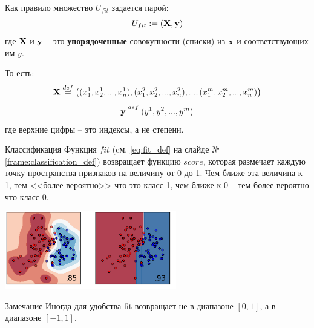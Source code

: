 	\begin{frame}
	Как правило множество $U_{fit}$ задается парой:
	\begin{equation}
		U_{fit} := (\bold X, \bold y) 
	\end{equation}
	где $\bold X$ и $\bold y$ -- это \textbf{упорядоченные} совокупности (списки)
	из  $\bold  x$ и соответствующих им  $y$. 
	
	
	То есть:
	\begin{equation}
	\bold X \stackrel{def}{=} \left( 
	(x_1^1, x_2^1, ..., x_n^1),
	(x_1^2, x_2^2, ..., x_n^2),
	... ,
	(x_1^m, x_2^m, ..., x_n^m)
	\right)
	\end{equation}
	\begin{equation}
	\bold y \stackrel{def}{=} (y^1, y^2, ..., y^m) 
	\end{equation}
	где верхние цифры -- это индексы, а не степени.
	\end{frame}


	  
	\begin{frame}{Классификация}
	\small
	Функция $fit$ (cм. \eqref{eq:fit_def} на слайде №\ref{frame:classification_def}) возвращает функцию $score$, которая размечает каждую точку пространства признаков на величину от 0 до 1. Чем ближе эта величина к 1, тем <<более вероятно>> что это класс 1, чем ближе к 0 -- тем более вероятно что класс 0.
	\begin{center}
		\includegraphics[width=7.5cm]{../pic/classification_example.png}\centering
	\end{center}
    \begin{block}{Замечание}
    Иногда для удобства fit возвращает не в диапазоне $[0, 1]$,
    а в диапазоне $[-1, 1]$.
    \end{block}
\end{frame}



